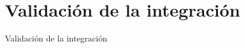 \section{Validaci\'on de la integraci\'on}
\label{Validacion_integracion}

Validaci\'on de la integraci\'on
\par

